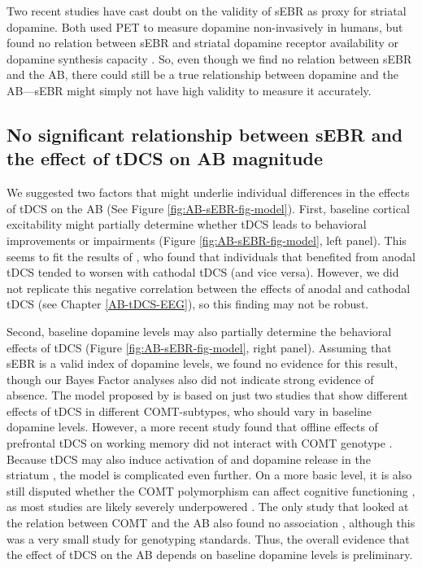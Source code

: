 \documentclass[11pt,]{memoir}
\begin{document}
Two recent studies have cast doubt on the validity of sEBR as proxy for striatal dopamine. Both used PET to measure dopamine non-invasively in humans, but found no relation between sEBR and striatal dopamine receptor availability \autocite{Dang2017} or dopamine synthesis capacity \autocite{Sescousse2018}. So, even though we find no relation between sEBR and the AB, there could still be a true relationship between dopamine and the AB---sEBR might simply not have high validity to measure it accurately.

\hypertarget{no-significant-relationship-between-sebr-and-the-effect-of-tdcs-on-ab-magnitude}{%
\subsection{No significant relationship between sEBR and the effect of tDCS on AB magnitude}\label{no-significant-relationship-between-sebr-and-the-effect-of-tdcs-on-ab-magnitude}}

We suggested two factors that might underlie individual differences in the effects of tDCS on the AB (See Figure \ref{fig:AB-sEBR-fig-model}). First, baseline cortical excitability might partially determine whether tDCS leads to behavioral improvements or impairments \autocite{Krause2013} (Figure \ref{fig:AB-sEBR-fig-model}, left panel). This seems to fit the results of \textcite{London2015}, who found that individuals that benefited from anodal tDCS tended to worsen with cathodal tDCS (and vice versa). However, we did not replicate this negative correlation between the effects of anodal and cathodal tDCS (see Chapter \ref{AB-tDCS-EEG}), so this finding may not be robust.

Second, baseline dopamine levels may also partially determine the behavioral effects of tDCS \autocite{Wiegand2016} (Figure \ref{fig:AB-sEBR-fig-model}, right panel). Assuming that sEBR is a valid index of dopamine levels, we found no evidence for this result, though our Bayes Factor analyses also did not indicate strong evidence of absence. The model proposed by \textcite{Wiegand2016} is based on just two studies \autocites{Plewnia2013}{Nieratschker2015} that show different effects of tDCS in different COMT-subtypes, who should vary in baseline dopamine levels. However, a more recent study found that offline effects of prefrontal tDCS on working memory did not interact with COMT genotype \autocite{Jongkees2018}. Because tDCS may also induce activation of \autocite{Meyer2019} and dopamine release in the striatum \autocites{Tanaka2013}{Fonteneau2018}, the model is complicated even further. On a more basic level, it is also still disputed whether the COMT polymorphism can affect cognitive functioning \autocite{Barnett2008}, as most studies are likely severely underpowered \autocite{Border2019}. The only study that looked at the relation between COMT and the AB also found no association \autocite{Colzato2011}, although this was a very small study for genotyping standards. Thus, the overall evidence that the effect of tDCS on the AB depends on baseline dopamine levels is preliminary.
\end{document}
